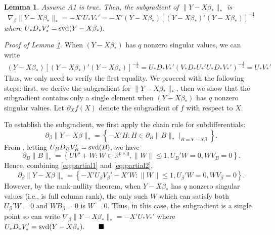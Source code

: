 \documentclass[12pt]{article}
\newtheorem{lemma}{Lemma}
\begin{document}
\begin{lemma}\label{lemma:grad}
Assume A1 is true. Then, the subgradient of $\|Y - X\beta_*\|_*$ is 
$$ \nabla_\beta \|Y - X\beta_*\|_* =  - X'U_* V_*' = - X'(Y - X\beta_*)[(Y - X\beta_*)'(Y- X\beta_*)]^{-\frac{1}{2}}$$
where $U_* D_* V_*' = {\rm svd}(Y - X\beta_*).$
\end{lemma}
\noindent \textit{Proof of Lemma \ref{lemma:grad}.} When $(Y- X\beta_*)$ has $q$ nonzero singular values, we can write 
\begin{align*} 
(Y - X\beta_*)[(Y - X\beta_*)'(Y- X\beta_*)]^{-\frac{1}{2}} = U_* D_* V_*'(V_* D_* U_*'U_* D_* V_*' )^{-\frac{1}{2}}  = U_* V_*' 
\end{align*}
Thus, we only need to verify the first equality. We proceed with the following steps: first, we derive the subgradient for $\|Y - X\beta_*\|_*$, then we show that the subgradient contains only a single element when $(Y - X\beta_*)$ has $q$ nonzero singular values. Let $\partial_X f(X)$ denote the subgradient of $f$ with respect to $X$. 


To establish the subgradient, we first apply the chain rule for subdifferentials:
\begin{equation}\label{eq:partial1}
\partial_\beta \|Y - X\beta\|_* = \left\{ - X'H: H \in \partial_B \|B\|_*\mid_{B = Y - X\beta} \right\}.
\end{equation} 
From \citet{watson1992characterization}, letting $U_BD_BV_B' = {\rm svd}(B)$, we have 
\begin{equation}\label{eq:partial2}
 \partial_B\|B\|_* = \left\{UV' + W: W \in \mathbb{R}^{p \times q}, \|W\|\leq 1, U_B'W = 0, W V_B = 0 \right\}.
 \end{equation}
Hence, combining \eqref{eq:partial1} and \eqref{eq:partial2},
$$ \partial_\beta \|Y - X\beta\|_*  = \left\{ -X'U_\beta V_\beta' - X'W:  \|W\|\leq 1, U_\beta'W = 0, W V_\beta = 0\right\}.$$
However, by the rank-nullity theorem, when $Y - X\beta_*$ has $q$ nonzero singular values (i.e., is full column rank), the only such $W$ which can satisfy both $U_\beta'W = 0$ and $W B_\beta = 0$ is $W = 0$. Thus, in this case, the subgradient is a single point so can write
$\nabla_\beta \|Y - X\beta_*\|_* = - X'U_* V_*'$ where $U_* D_* V_*' = {\rm svd}(Y - X\beta_*). \quad\quad \blacksquare$

\bigskip
\end{document}
